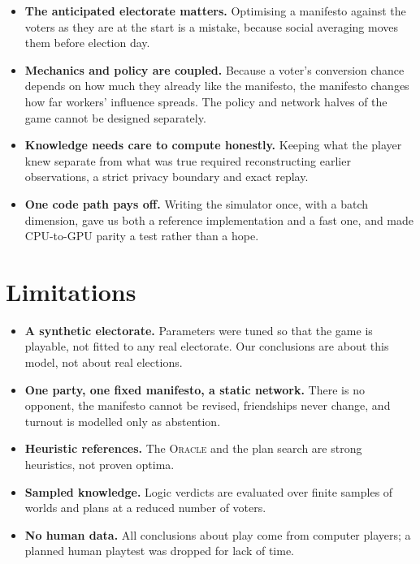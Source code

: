 \documentclass[11pt,a4paper,oneside]{report}
\newcommand{\ORACLE}{\textsc{Oracle}}
\begin{document}
\begin{itemize}
  \item \textbf{The anticipated electorate matters.} Optimising a manifesto against the voters as they are
        at the start is a mistake, because social averaging moves them before election day.
  \item \textbf{Mechanics and policy are coupled.} Because a voter's conversion chance depends on how much
        they already like the manifesto, the manifesto changes how far workers' influence spreads. The
        policy and network halves of the game cannot be designed separately.
  \item \textbf{Knowledge needs care to compute honestly.} Keeping what the player knew separate from what
        was true required reconstructing earlier observations, a strict privacy boundary and exact replay.
  \item \textbf{One code path pays off.} Writing the simulator once, with a batch dimension, gave us both a
        reference implementation and a fast one, and made CPU-to-GPU parity a test rather than a hope.
\end{itemize}

\section{Limitations}

\begin{itemize}
  \item \textbf{A synthetic electorate.} Parameters were tuned so that the game is playable, not fitted to
        any real electorate. Our conclusions are about this model, not about real elections.
  \item \textbf{One party, one fixed manifesto, a static network.} There is no opponent, the manifesto
        cannot be revised, friendships never change, and turnout is modelled only as abstention.
  \item \textbf{Heuristic references.} The \ORACLE{} and the plan search are strong heuristics, not proven
        optima.
  \item \textbf{Sampled knowledge.} Logic verdicts are evaluated over finite samples of worlds and plans at
        a reduced number of voters.
  \item \textbf{No human data.} All conclusions about play come from computer players; a planned human
        playtest was dropped for lack of time.
\end{itemize}
\end{document}

